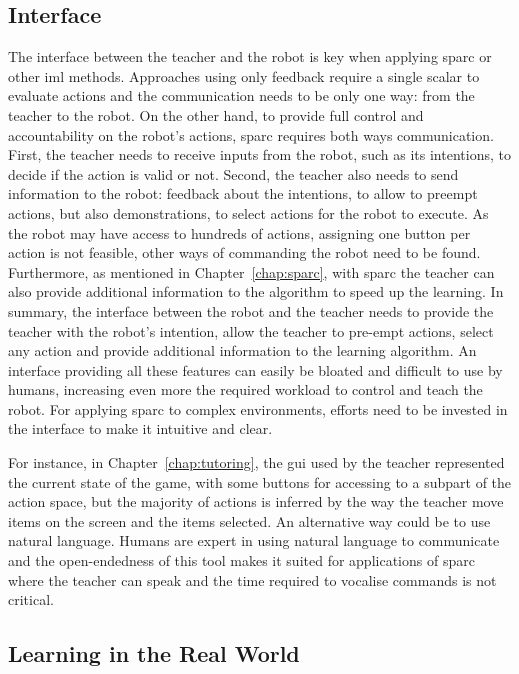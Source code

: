 \subsection{Interface}\label{sec:disc_lim_interface}
The interface between the teacher and the robot is key when applying \gls{sparc} or other \gls{iml} methods. Approaches using only feedback require a single scalar to evaluate actions and the communication needs to be only one way: from the teacher to the robot. On the other hand, to provide full control and accountability on the robot's actions, \gls{sparc} requires both ways communication. First, the teacher needs to receive inputs from the robot, such as its intentions, to decide if the action is valid or not. Second, the teacher also needs to send information to the robot: feedback about the intentions, to allow to preempt actions, but also demonstrations, to select actions for the robot to execute. As the robot may have access to hundreds of actions, assigning one button per action is not feasible, other ways of commanding the robot need to be found. Furthermore, as mentioned in Chapter~\ref{chap:sparc}, with \gls{sparc} the teacher can also provide additional information to the algorithm to speed up the learning. In summary, the interface between the robot and the teacher needs to provide the teacher with the robot's intention, allow the teacher to pre-empt actions, select any action and provide additional information to the learning algorithm. An interface providing all these features can easily be bloated and difficult to use by humans, increasing even more the required workload to control and teach the robot. For applying \gls{sparc} to complex environments, efforts need to be invested in the interface to make it intuitive and clear. 

For instance, in Chapter~\ref{chap:tutoring}, the \gls{gui} used by the teacher represented the current state of the game, with some buttons for accessing to a subpart of the action space, but the majority of actions is inferred by the way the teacher move items on the screen and the items selected. An alternative way could be to use natural language. Humans are expert in using natural language to communicate and the open-endedness of this tool makes it suited for applications of \gls{sparc} where the teacher can speak and the time required to vocalise commands is not critical.

\subsection{Learning in the Real World}

